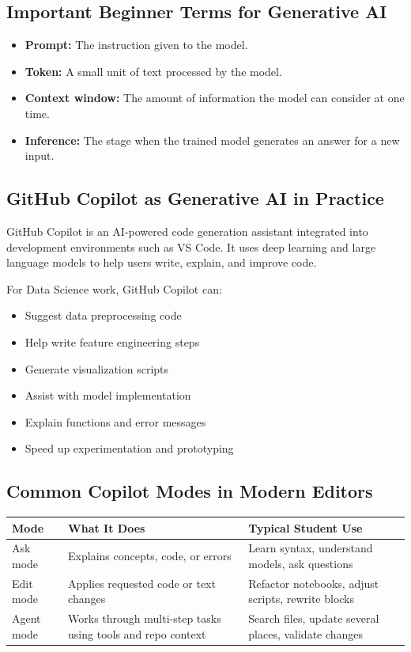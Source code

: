 \documentclass[11pt,a4paper]{article}
\begin{document}
\subsection{Important Beginner Terms for Generative AI}

\begin{itemize}[leftmargin=*]
  \item \textbf{Prompt:} The instruction given to the model.
  \item \textbf{Token:} A small unit of text processed by the model.
  \item \textbf{Context window:} The amount of information the model can consider at one time.
  \item \textbf{Inference:} The stage when the trained model generates an answer for a new input.
\end{itemize}

\subsection{GitHub Copilot as Generative AI in Practice}

\begin{definitionbox}
GitHub Copilot is an AI-powered code generation assistant integrated into development environments such as VS Code. It uses deep learning and large language models to help users write, explain, and improve code.
\end{definitionbox}

For Data Science work, GitHub Copilot can:
\begin{itemize}[leftmargin=*]
  \item Suggest data preprocessing code
  \item Help write feature engineering steps
  \item Generate visualization scripts
  \item Assist with model implementation
  \item Explain functions and error messages
  \item Speed up experimentation and prototyping
\end{itemize}

\subsection{Common Copilot Modes in Modern Editors}

\begin{longtable}{@{}p{2.7cm}p{3.8cm}p{5.9cm}@{}}
\toprule
\rowcolor{primary!15}
\textbf{Mode} & \textbf{What It Does} & \textbf{Typical Student Use} \\
\midrule
\endhead
Ask mode & Explains concepts, code, or errors & Learn syntax, understand models, ask questions \\
\addlinespace
Edit mode & Applies requested code or text changes & Refactor notebooks, adjust scripts, rewrite blocks \\
\addlinespace
Agent mode & Works through multi-step tasks using tools and repo context & Search files, update several places, validate changes \\
\bottomrule
\end{longtable}
\end{document}
